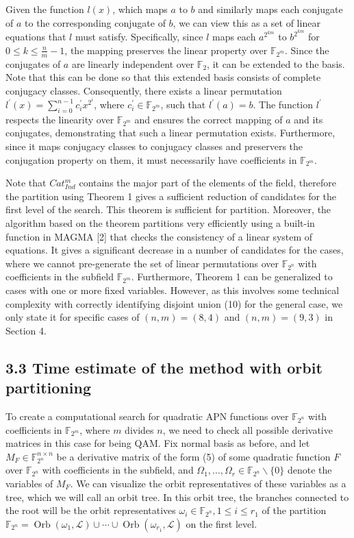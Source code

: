 \documentclass[10pt]{article}
\begin{document}
Given the function $l(x)$, which maps $a$ to $b$ and similarly maps each conjugate of $a$ to the corresponding conjugate of $b$, we can view this as a set of linear equations that $l$ must satisfy. Specifically, since $l$ maps each $a^{2^{k m}}$ to $b^{2^{k m}}$ for $0 \leq k \leq \frac{n}{m}-1$, the mapping preserves the linear property over $\mathbb{F}_{2^{m}}$. Since the conjugates of $a$ are linearly independent over $\mathbb{F}_{2}$, it can be extended to the basis. Note that this can be done so that this extended basis consists of complete conjugacy classes. Consequently, there exists a linear permutation $l^{\prime}(x)=\sum_{i=0}^{n-1} c_{i}^{\prime} x^{2^{i}}$, where $c_{i}^{\prime} \in \mathbb{F}_{2^{m}}$, such that $l^{\prime}(a)=b$. The function $l^{\prime}$ respects the linearity over $\mathbb{F}_{2^{m}}$ and ensures the correct mapping of $a$ and its conjugates, demonstrating that such a linear permutation exists. Furthermore, since it maps conjugacy classes to conjugacy classes and preservers the conjugation property on them, it must necessarily have coefficients in $\mathbb{F}_{2^{m}}$.

Note that $C a t_{I n d}^{m}$ contains the major part of the elements of the field, therefore the partition using Theorem 1 gives a sufficient reduction of candidates for the first level of the search. This theorem is sufficient for partition. Moreover, the algorithm based on the theorem partitions very efficiently using a built-in function in MAGMA [2] that checks the consistency of a linear system of equations. It gives a significant decrease in a number of candidates for the cases, where we cannot pre-generate the set of linear permutations over $\mathbb{F}_{2^{n}}$ with coefficients in the subfield $\mathbb{F}_{2^{m}}$. Furthermore, Theorem 1 can be generalized to cases with one or more fixed variables. However, as this involves some technical complexity with correctly identifying disjoint union (10) for the general case, we only state it for specific cases of $(n, m)=(8,4)$ and $(n, m)=(9,3)$ in Section 4.

\subsection*{3.3 Time estimate of the method with orbit partitioning}
To create a computational search for quadratic APN functions over $\mathbb{F}_{2^{n}}$ with coefficients in $\mathbb{F}_{2^{m}}$, where $m$ divides $n$, we need to check all possible derivative matrices in this case for being QAM. Fix normal basis as before, and let $M_{F} \in \mathbb{F}_{2^{n}}^{n \times n}$ be a derivative matrix of the form (5) of some quadratic function $F$ over $\mathbb{F}_{2^{n}}$ with coefficients in the subfield, and $\Omega_{1}, \ldots, \Omega_{r} \in \mathbb{F}_{2^{n}} \backslash\{0\}$ denote the variables of $M_{F}$. We can visualize the orbit representatives of these variables as a tree, which we will call an orbit tree. In this orbit tree, the branches connected to the root will be the orbit representatives $\omega_{i} \in \mathbb{F}_{2^{n}}, 1 \leq i \leq r_{1}$ of the partition $\mathbb{F}_{2^{n}}=\operatorname{Orb}\left(\omega_{1}, \mathcal{L}\right) \cup \cdots \cup \operatorname{Orb}\left(\omega_{r_{1}}, \mathcal{L}\right)$ on the first level.
\end{document}
